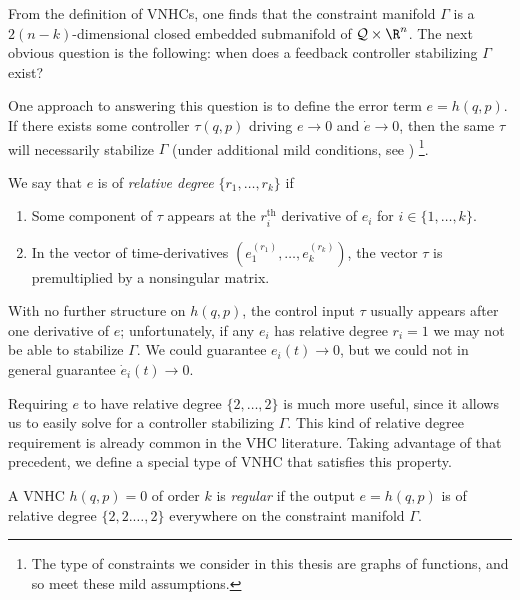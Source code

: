 From the definition of VNHCs, one finds that the constraint manifold \(\Gamma\)
is a \(2(n-k)\)-dimensional closed embedded submanifold of \(\mathcal{Q} \times \R^n\). 
The next obvious question is the following: when does a feedback controller
stabilizing \(\Gamma\) exist?

One approach to answering this question is to
define the error term \(e = h(q,p)\). 
If there exists some controller \(\tau(q,p)\) driving \(e \to 0\) and 
\(\dot{e} \to 0\), then the same \(\tau\) will necessarily stabilize \(\Gamma\)
(under additional mild conditions, see \cite{vhcs_for_el_systems})
\footnote{The type of constraints we consider in this thesis are graphs of
functions, and so meet these mild assumptions.}.

We say that \(e\) is of \textit{relative degree} \(\{r_1,\ldots,r_k\}\) if
\begin{enumerate}
    \item Some component of \(\tau\) appears at the \(r_i^\text{th}\) derivative
        of \(e_i\) for \(i \in \{1,\ldots,k\}\).
    \item In the vector of time-derivatives
        \((e_1^{(r_1)}, \ldots, e_k^{(r_k)})\), the vector \(\tau\) is
        premultiplied by a nonsingular matrix.
\end{enumerate}
With no further structure on \(h(q,p)\), the control input \(\tau\) usually
appears after one derivative of \(e\); 
unfortunately, if any \(e_i\) has relative degree \(r_i = 1\) we may not
be able to stabilize \(\Gamma\). 
We could guarantee \(e_i(t) \to 0\), but we could not in general guarantee 
\(\dot{e}_i(t) \to 0\). 

Requiring \(e\) to have relative degree \(\{2,\ldots,2\}\) is much more
useful, since it allows us to easily solve for a controller stabilizing \(\Gamma\).
This kind of relative degree requirement is already common in the VHC
literature.
Taking advantage of that precedent, we define a special type of VNHC that
satisfies this property.

\begin{defn}
    A VNHC \(h(q,p) = 0\) of order \(k\) is \textit{regular} if the output 
    \(e = h(q,p)\) is of relative degree \(\{2,2.\ldots,2\}\) everywhere on the
    constraint manifold \(\Gamma\).
\end{defn}

